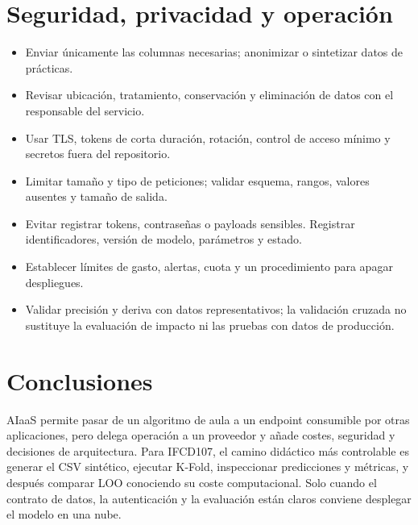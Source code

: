 \documentclass[11pt,a4paper]{article}
\begin{document}
\section{Seguridad, privacidad y operación}
\begin{itemize}
  \item Enviar únicamente las columnas necesarias; anonimizar o sintetizar datos de prácticas.
  \item Revisar ubicación, tratamiento, conservación y eliminación de datos con el responsable del servicio.
  \item Usar TLS, tokens de corta duración, rotación, control de acceso mínimo y secretos fuera del repositorio.
  \item Limitar tamaño y tipo de peticiones; validar esquema, rangos, valores ausentes y tamaño de salida.
  \item Evitar registrar tokens, contraseñas o payloads sensibles. Registrar identificadores, versión de modelo, parámetros y estado.
  \item Establecer límites de gasto, alertas, cuota y un procedimiento para apagar despliegues.
  \item Validar precisión y deriva con datos representativos; la validación cruzada no sustituye la evaluación de impacto ni las pruebas con datos de producción.
\end{itemize}

\section{Conclusiones}
AIaaS permite pasar de un algoritmo de aula a un endpoint consumible por otras aplicaciones, pero delega operación a un proveedor y añade costes, seguridad y decisiones de arquitectura. Para IFCD107, el camino didáctico más controlable es generar el CSV sintético, ejecutar K-Fold, inspeccionar predicciones y métricas, y después comparar LOO conociendo su coste computacional. Solo cuando el contrato de datos, la autenticación y la evaluación están claros conviene desplegar el modelo en una nube.
\end{document}

